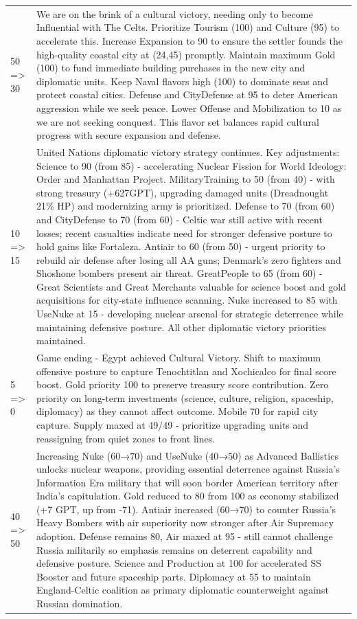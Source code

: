 \begin{longtable}{p{}p{}}
50 => 30 & We are on the brink of a cultural victory, needing only to become Influential with The Celts. Prioritize Tourism (100) and Culture (95) to accelerate this. Increase Expansion to 90 to ensure the settler founds the high-quality coastal city at (24,45) promptly. Maintain maximum Gold (100) to fund immediate building purchases in the new city and diplomatic units. Keep Naval flavors high (100) to dominate seas and protect coastal cities. Defense and CityDefense at 95 to deter American aggression while we seek peace. Lower Offense and Mobilization to 10 as we are not seeking conquest. This flavor set balances rapid cultural progress with secure expansion and defense. \\
10 => 15 & United Nations diplomatic victory strategy continues. Key adjustments: Science to 90 (from 85) - accelerating Nuclear Fission for World Ideology: Order and Manhattan Project. MilitaryTraining to 50 (from 40) - with strong treasury (+627GPT), upgrading damaged units (Dreadnought 21\% HP) and modernizing army is prioritized. Defense to 70 (from 60) and CityDefense to 70 (from 60) - Celtic war still active with recent losses; recent casualties indicate need for stronger defensive posture to hold gains like Fortaleza. Antiair to 60 (from 50) - urgent priority to rebuild air defense after losing all AA guns; Denmark's zero fighters and Shoshone bombers present air threat. GreatPeople to 65 (from 60) - Great Scientists and Great Merchants valuable for science boost and gold acquisitions for city-state influence scanning. Nuke increased to 85 with UseNuke at 15 - developing nuclear arsenal for strategic deterrence while maintaining defensive posture. All other diplomatic victory priorities maintained. \\
5 => 0 & Game ending - Egypt achieved Cultural Victory. Shift to maximum offensive posture to capture Tenochtitlan and Xochicalco for final score boost. Gold priority 100 to preserve treasury score contribution. Zero priority on long-term investments (science, culture, religion, spaceship, diplomacy) as they cannot affect outcome. Mobile 70 for rapid city capture. Supply maxed at 49/49 - prioritize upgrading units and reassigning from quiet zones to front lines. \\
40 => 50 & Increasing Nuke (60→70) and UseNuke (40→50) as Advanced Ballistics unlocks nuclear weapons, providing essential deterrence against Russia's Information Era military that will soon border American territory after India's capitulation. Gold reduced to 80 from 100 as economy stabilized (+7 GPT, up from -71). Antiair increased (60→70) to counter Russia's Heavy Bombers with air superiority now stronger after Air Supremacy adoption. Defense remains 80, Air maxed at 95 - still cannot challenge Russia militarily so emphasis remains on deterrent capability and defensive posture. Science and Production at 100 for accelerated SS Booster and future spaceship parts. Diplomacy at 55 to maintain England-Celtic coalition as primary diplomatic counterweight against Russian domination. \\

\end{longtable}

